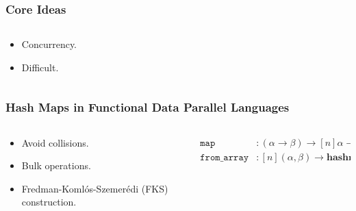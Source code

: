 \documentclass[aspectratio=169]{beamer}
\newcommand{\kw}[1]{\ensuremath{\mathtt{#1}}}
\newcommand{\Map}{\kw{map}}
\begin{document}
\begin{frame}\frametitle{Core Ideas}
  \begin{columns}
  \begin{column}{.38\textwidth}
  \hfill
  \begin{itemize}
    \item Concurrency.
    \item<2-> Difficult.
  \end{itemize}
  \hfill  
  \end{column}
  \hfill
  \end{columns}
\end{frame}

\begin{frame}\frametitle{Hash Maps in Functional Data Parallel Languages}
  \begin{columns}
  \begin{column}{.38\textwidth}
  \hfill
  \begin{itemize}
    \item Avoid collisions.
    \item Bulk operations.
    \item<2-> Fredman-Komlós-Szemerédi (FKS) construction. 
  \end{itemize}
  \hfill  
  \end{column}
  \hfill
  \begin{column}{.6\textwidth}
    \begin{align*}
      \Map & : (\alpha \to \beta) \to [n]\alpha \to [n]\beta \\
      \mathtt{from\_array} & : [n](\alpha, \beta) \to \mathbf{hashmap} ~ \alpha ~ \beta
    \end{align*} 
  \end{column}
  \end{columns}
\end{frame}
\end{document}
